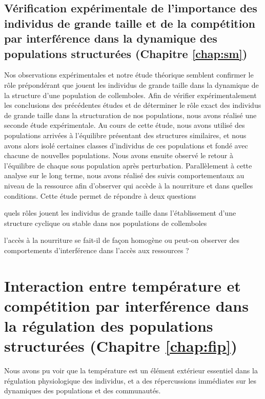 \subsection{Vérification expérimentale de l'importance des individus de
grande taille et de la compétition par interférence dans la dynamique des
populations structurées (Chapitre \ref{chap:sm})}

Nos observations expérimentales et notre étude théorique semblent confirmer le
rôle prépondérant que jouent les individus de grande taille dans la dynamique de
la structure d'une population de collemboles. Afin de vérifier expérimentalement
les conclusions des précédentes études et de déterminer le rôle exact des
individus de grande taille dans la structuration de nos populations, nous avons
réalisé une seconde étude expérimentale. Au cours de cette étude, nous avons
utilisé des populations arrivées à l'équilibre présentant des structures
similaires, et nous avons alors isolé certaines classes d'individus de ces
populations et fondé avec chacune de nouvelles populations. Nous avons ensuite
observé le retour à l'équilibre de chaque sous population après perturbation.
Parallèlement à cette analyse sur le long terme, nous avons réalisé des suivis
comportementaux au niveau de la ressource afin d'observer qui accède à la
nourriture et dans quelles conditions. Cette étude permet de répondre à deux
questions \begin{enumerate*}[label=(\roman*), before=\unskip{ : }, itemjoin={{ ? }},
itemjoin*={{ ? Et }}] \item quels rôles jouent les individus de grande taille
dans l'établissement d'une structure cyclique ou stable dans nos populations de
collemboles \item l'accès à la nourriture se fait-il de façon homogène ou
peut-on observer des comportements d'interférence dans l'accès aux ressources ?
\end{enumerate*}

\section{Interaction entre température et compétition par interférence dans
la régulation des populations structurées (Chapitre \ref{chap:fip})}

Nous avons pu voir que la température est un élément extérieur essentiel dans la
régulation physiologique des individus, et a des répercussions immédiates sur
les dynamiques des populations et des communautés. 


